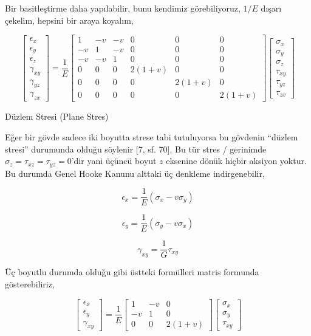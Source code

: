 \documentclass[12pt,fleqn]{article}\usepackage{../../common}
\begin{document}
Bir basitleştirme daha yapılabilir, bunu kendimiz görebiliyoruz, $1/E$ dışarı
çekelim, hepsini bir araya koyalım,

$$
\left[\begin{array}{c}
\epsilon_x \\ \epsilon_y \\ \epsilon_z \\ \gamma_{xy} \\ \gamma_{yz} \\ \gamma_{zx}
\end{array}\right] =
\frac{1}{E}
\left[\begin{array}{cccccc}
1 & -v & -v & 0 & 0 & 0 \\
-v & 1 & -v & 0 & 0 & 0 \\
-v & -v & 1 & 0 & 0 & 0 \\
0 & 0 & 0 & 2(1+v) & 0 & 0 \\
0 & 0 & 0 & 0 & 2(1+v) & 0 \\
0 & 0 & 0 & 0 & 0 & 2(1+v)
\end{array}\right]
\left[\begin{array}{c}
\sigma_x \\ \sigma_y \\ \sigma_z \\ \tau_{xy} \\ \tau_{yz} \\ \tau_{zx}
\end{array}\right]
$$

Düzlem Stresi (Plane Stres)

Eğer bir gövde sadece iki boyutta strese tabi tutuluyorsa bu gövdenin ``düzlem
stresi'' durumunda olduğu söylenir [7, sf. 70]. Bu tür stres / gerinimde
$\sigma_z = \tau_{xz} = \tau_{yz} = 0$'dir yani üçüncü boyut $z$ eksenine dönük
hiçbir aksiyon yoktur. Bu durumda Genel Hooke Kanunu alttaki üç denkleme
indirgenebilir,

$$
\epsilon_x = \frac{1}{E} (\sigma_x - v \sigma_y )
$$

$$
\epsilon_y = \frac{1}{E} (\sigma_y - v \sigma_x )
$$

$$
\gamma_{xy} = \frac{1}{G} \tau_{xy}
$$

Üç boyutlu durumda olduğu gibi üstteki formülleri matris formunda
gösterebiliriz,

$$
\left[\begin{array}{c}
\epsilon_{x} \\ \epsilon_{y} \\ \gamma_{xy}
\end{array}\right] =
\frac{1}{E}
\left[\begin{array}{ccc}
1 & -v & 0 \\
-v & 1 & 0 \\
0 & 0 & 2(1+v)
\end{array}\right]
\left[\begin{array}{c}
\sigma_x \\ \sigma_y \\ \tau_{xy}
\end{array}\right]
$$
\end{document}
